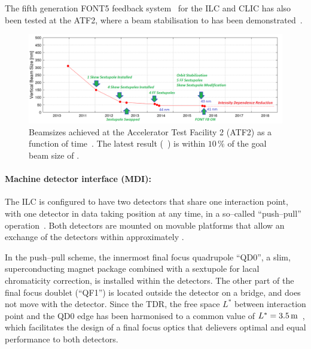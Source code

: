 The fifth generation FONT5 feedback system~\cite{Apsimon:2018bpq} for the ILC and CLIC has also been tested at the ATF2, where a beam stabilisation to  has been demonstrated~\cite{Ramjiawan:2018egu}.

\begin{figure}[htbp]
   \includegraphics[width=\hsize]{chapters/figures/ATF2trend2018}
\caption{Beamsizes achieved at the Accelerator Test Facility 2 (ATF2) as a function of time~\cite{bib:atf2esu}. The latest result (~\cite{Okugi:2017jji}) is within $10\,\%$ of the goal beam size of .}
\label{fig:atf-results}
\end{figure}

\paragraph {Machine detector interface (MDI):}



The ILC is configured to have two detectors that share one interaction point, with one detector in data taking position at any time, in a so--called ``push--pull'' operation~\cite[Sec. 8.4]{Adolphsen:2013jya}.
Both detectors are mounted on movable platforms that allow an exchange of the detectors within approximately .

In the push--pull scheme, the innermost final focus quadrupole ``QD0'', a slim, superconducting magnet package combined with a sextupole for lacal chromaticity correction, is installed within the detectors. 
The other part of the final focus doublet (``QF1'') is located outside the detector on a bridge, and does not move with the detector.
Since the TDR, the free space $L^*$ between interaction point and the QD0 edge has been harmonised to a common value of $L^*=3.5\,{\mathrm{m}}$~\cite{bib:cr-0002}, which facilitates the design of a final focus optics that delievers optimal and equal performance to both detectors.


